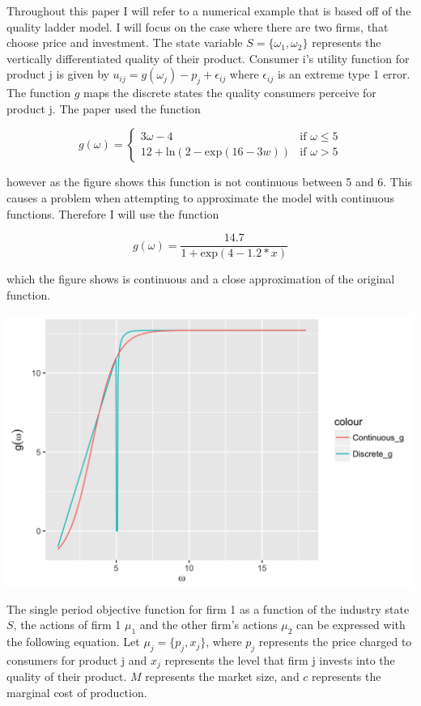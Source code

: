 \documentclass[12pt]{article}
\begin{document}
Throughout this paper I will refer to a numerical example that is based off of the \citet{1992_Pakes_McGuire_NBER} quality ladder model. I will focus on the case where there are two firms, that choose price and investment. The state variable $S=\{\omega_1,\omega_2\}$ represents the vertically differentiated quality of their product. Consumer i's utility function for product j is given by $u_{ij}=g(\omega_j) - p_j + \epsilon_{ij}$ where $\epsilon_{ij}$ is an extreme type 1 error. The function $g$ maps the discrete states the quality consumers perceive for product j. The \citet{1992_Pakes_McGuire_NBER} paper used the function

\begin{equation*}
  g(\omega) =
  \begin{cases}
    3\omega-4 & \text{if } \omega \leq 5\\
    12+\text{ln}(2-\text{exp}(16-3w)) & \text{if } \omega >5
  \end{cases}
\end{equation*}

however as the figure shows this function is not continuous between 5 and 6. This causes a problem when attempting to approximate the model with continuous functions. Therefore I will use the function

\begin{equation*}
  g(\omega) = \frac{14.7}{1+\text{exp}(4-1.2*x)}
\end{equation*}

which the figure shows is continuous and a close approximation of the original function.

\includegraphics{plot_g}

The single period objective function for firm 1 as a function of the industry state $S$, the actions of firm 1 $\mu_1$ and the other firm's actions $\mu_{2}$ can be expressed with the following equation. Let $\mu_j=\{p_j,x_j\}$, where $p_j$ represents the price charged to consumers for product j and $x_j$ represents the level that firm j invests into the quality of their product. $M$ represents the market size, and $c$ represents the marginal cost of production.
\end{document}
